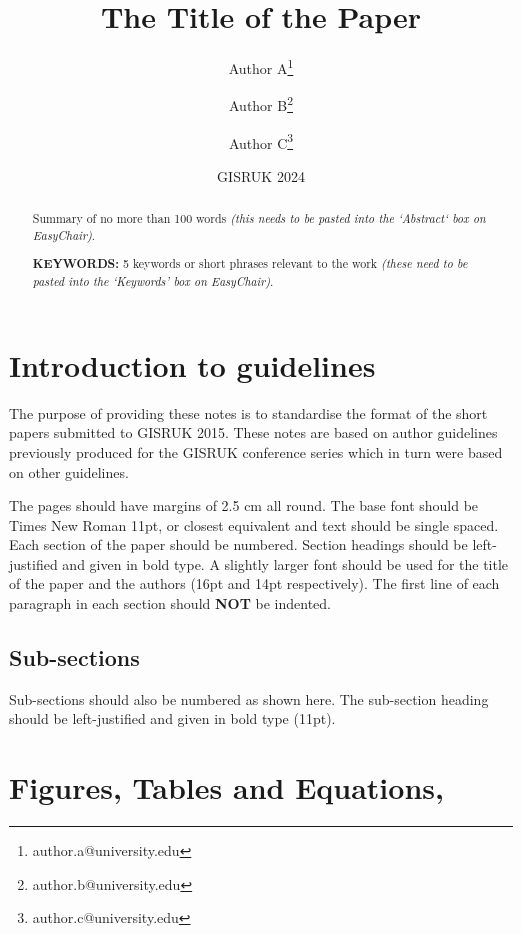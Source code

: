\documentclass[11pt]{article}
\date{GISRUK 2024}
\title{The Title of the Paper}
\author[1]{Author A\thanks{author.a@university.edu}}
\author[1]{Author B\thanks{author.b@university.edu}}
\author[2]{Author C\thanks{author.c@university.edu}}
\affil[1]{Department of Computer Science, \LaTeX\ University}
\affil[2]{Department of Mechanical Engineering, \LaTeX\ University}
\begin{document}
\maketitle


\begin{abstract}
\centering

Summary of no more than 100 words \textit{(this needs to be pasted into the `Abstract` box on EasyChair)}.

$ $ \\ {\bf KEYWORDS:} 5 keywords or short phrases relevant to the work \textit{(these need to be pasted into the `Keywords' box on EasyChair)}.

\end{abstract}


\section{Introduction to guidelines}

The purpose of providing these notes is to standardise the format of the short papers submitted to GISRUK 2015. These notes are based on author guidelines previously produced for the GISRUK conference series which in turn were based on other guidelines.

The pages should have margins of 2.5 cm all round. The base font should be Times New Roman 11pt, or closest equivalent and text should be single spaced. Each section of the paper should be numbered. Section headings should be left-justified and given in bold type.  A slightly larger font should be used for the title of the paper and the authors (16pt and 14pt respectively). The first line of each paragraph in each section should \textbf{NOT} be indented.

\subsection{Sub-sections}

Sub-sections should also be numbered as shown here. The sub-section heading should be left-justified and given in bold type (11pt). 

\section{Figures, Tables and Equations,}
\end{document}
